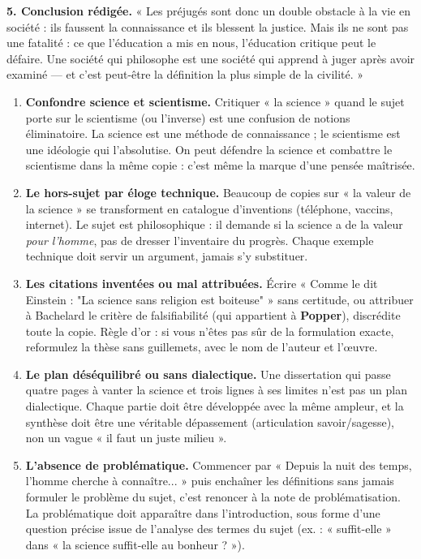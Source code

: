\documentclass[11pt]{article}
\begin{document}
\begin{exoresolu}
\textbf{5. Conclusion rédigée.} « Les préjugés sont donc un double obstacle à la vie en société : ils faussent la connaissance et ils blessent la justice. Mais ils ne sont pas une fatalité : ce que l'éducation a mis en nous, l'éducation critique peut le défaire. Une société qui philosophe est une société qui apprend à juger après avoir examiné — et c'est peut-être la définition la plus simple de la civilité. »
\end{exoresolu}

\begin{attention}
\begin{enumerate}
\item \textbf{Confondre science et scientisme.} Critiquer « la science » quand le sujet porte sur le scientisme (ou l'inverse) est une confusion de notions éliminatoire. La science est une méthode de connaissance ; le scientisme est une idéologie qui l'absolutise. On peut défendre la science et combattre le scientisme dans la même copie : c'est même la marque d'une pensée maîtrisée.
\item \textbf{Le hors-sujet par éloge technique.} Beaucoup de copies sur « la valeur de la science » se transforment en catalogue d'inventions (téléphone, vaccins, internet). Le sujet est philosophique : il demande si la science a de la valeur \emph{pour l'homme}, pas de dresser l'inventaire du progrès. Chaque exemple technique doit servir un argument, jamais s'y substituer.
\item \textbf{Les citations inventées ou mal attribuées.} Écrire « Comme le dit Einstein : "La science sans religion est boiteuse" » sans certitude, ou attribuer à Bachelard le critère de falsifiabilité (qui appartient à \textbf{Popper}), discrédite toute la copie. Règle d'or : si vous n'êtes pas sûr de la formulation exacte, reformulez la thèse sans guillemets, avec le nom de l'auteur et l'œuvre.
\item \textbf{Le plan déséquilibré ou sans dialectique.} Une dissertation qui passe quatre pages à vanter la science et trois lignes à ses limites n'est pas un plan dialectique. Chaque partie doit être développée avec la même ampleur, et la synthèse doit être une véritable dépassement (articulation savoir/sagesse), non un vague « il faut un juste milieu ».
\item \textbf{L'absence de problématique.} Commencer par « Depuis la nuit des temps, l'homme cherche à connaître... » puis enchaîner les définitions sans jamais formuler le problème du sujet, c'est renoncer à la note de problématisation. La problématique doit apparaître dans l'introduction, sous forme d'une question précise issue de l'analyse des termes du sujet (ex. : « suffit-elle » dans « la science suffit-elle au bonheur ? »).
\end{enumerate}
\end{attention}
\end{document}

